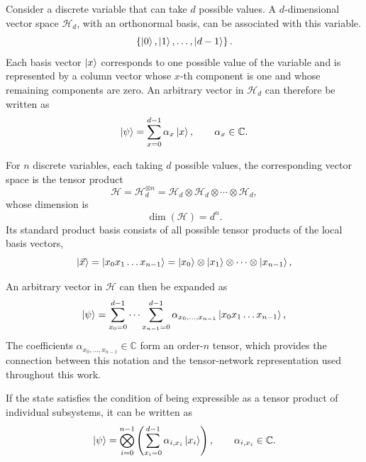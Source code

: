 \documentclass[%
 reprint,
 amsmath,amssymb,
 aps,
 pra,showkeys,
]{revtex4-2}
\begin{document}
Consider a discrete variable that can take \(d\) possible values. A \(d\)-dimensional vector space \(\mathcal{H}_d\), with an orthonormal basis, can be associated with this variable.
\begin{equation}
    \left\{\ket{0},\ket{1},\ldots,\ket{d-1}\right\}.
\end{equation}
Each basis vector $\ket{x}$ corresponds to one possible value of the
variable and is represented by a column vector whose $x$-th component is
one and whose remaining components are zero. An arbitrary vector in
$\mathcal{H}_d$ can therefore be written as
\begin{equation}
    \ket{\psi}
    =
    \sum_{x=0}^{d-1}\alpha_x\ket{x},
    \qquad
    \alpha_x\in\mathbb{C}.
\end{equation}

For $n$ discrete variables, each taking $d$ possible values, the
corresponding vector space is the tensor product
\begin{equation}
    \mathcal{H}
    =
    \mathcal{H}_d^{\otimes n}
    =
    \mathcal{H}_d\otimes\mathcal{H}_d\otimes\cdots\otimes\mathcal{H}_d,
\end{equation}
whose dimension is
\begin{equation}
    \dim(\mathcal{H})=d^n.
\end{equation}
Its standard product basis consists of all possible tensor products of
the local basis vectors,
\begin{equation}
    \ket{\vec{x}}
    =
    \ket{x_0x_1\ldots x_{n-1}}
    =
    \ket{x_0}\otimes\ket{x_1}\otimes\cdots\otimes\ket{x_{n-1}},
\end{equation}

An arbitrary vector in $\mathcal{H}$ can then be expanded as
\begin{equation}
    \ket{\psi}
    =
    \sum_{x_0=0}^{d-1}\cdots
    \sum_{x_{n-1}=0}^{d-1}
    \alpha_{x_0,\ldots,x_{n-1}}
    \ket{x_0x_1\ldots x_{n-1}},
\end{equation}
The coefficients $\alpha_{x_0,\ldots,x_{n-1}}\in\mathbb{C}$ form an order-$n$
tensor, which provides the connection between this notation and the
tensor-network representation used throughout this work.

If the state satisfies the condition of being expressible as a tensor product of individual subsystems, it can be written as
\begin{equation}
    \ket{\psi}
    =
    \bigotimes_{i=0}^{n-1}
    \left(
        \sum_{x_i=0}^{d-1}
        \alpha_{i,x_i}\ket{x_i}
    \right),
    \qquad
    \alpha_{i,x_i}\in\mathbb{C}.
\end{equation}
\end{document}
